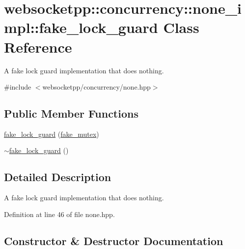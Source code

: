 \hypertarget{classwebsocketpp_1_1concurrency_1_1none__impl_1_1fake__lock__guard}{}\section{websocketpp\+:\+:concurrency\+:\+:none\+\_\+impl\+:\+:fake\+\_\+lock\+\_\+guard Class Reference}
\label{classwebsocketpp_1_1concurrency_1_1none__impl_1_1fake__lock__guard}


A fake lock guard implementation that does nothing.  




{\ttfamily \#include $<$websocketpp/concurrency/none.\+hpp$>$}

\subsection*{Public Member Functions}
\begin{DoxyCompactItemize}
\item 
\hyperlink{classwebsocketpp_1_1concurrency_1_1none__impl_1_1fake__lock__guard_a6b1764d95374ca8e341e187427088150}{fake\+\_\+lock\+\_\+guard} (\hyperlink{classwebsocketpp_1_1concurrency_1_1none__impl_1_1fake__mutex}{fake\+\_\+mutex})
\item 
\hyperlink{classwebsocketpp_1_1concurrency_1_1none__impl_1_1fake__lock__guard_a727b1ccbb3e732fae072820dcced7a49}{$\sim$fake\+\_\+lock\+\_\+guard} ()
\end{DoxyCompactItemize}


\subsection{Detailed Description}
A fake lock guard implementation that does nothing. 

Definition at line 46 of file none.\+hpp.



\subsection{Constructor \& Destructor Documentation}
\hypertarget{classwebsocketpp_1_1concurrency_1_1none__impl_1_1fake__lock__guard_a6b1764d95374ca8e341e187427088150}{}
